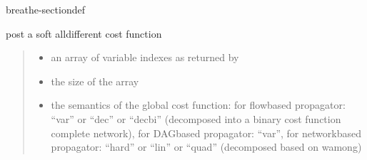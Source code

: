 \documentclass[letterpaper,10pt,openany,oneside,english]{sphinxmanual}
\begin{document}
\begin{fulllineitems}
\begin{sphinxuseclass}{breathe-sectiondef}
\begin{fulllineitems}
\label{\detokenize{ref/ref_cpp:_CPPv4N11WeightedCSP12postWAllDiffER6vectorIiERK6stringRK6string4Cost}}\label{\detokenize{ref/ref_cpp:_CPPv3N11WeightedCSP12postWAllDiffER6vectorIiERK6stringRK6string4Cost}}\label{\detokenize{ref/ref_cpp:_CPPv2N11WeightedCSP12postWAllDiffER6vectorIiERK6stringRK6string4Cost}}\label{\detokenize{ref/ref_cpp:WeightedCSP::postWAllDiff__vector:i:R.stringCR.stringCR.Cost}}
\pysigstartsignatures
\pysigstartmultiline
{}
\pysigstopmultiline
\pysigstopsignatures
\sphinxAtStartPar
post a soft alldifferent cost function 
\begin{quote}\begin{description}
\begin{itemize}
\item {} 
\sphinxAtStartPar
{} \textendash{} an array of variable indexes as returned by {\hyperref[\detokenize{ref/ref_cpp:classWeightedCSP_1a2329c94c60817153e45de627c79f8281}]{}} 

\item {} 
\sphinxAtStartPar
{} \textendash{} the size of the array 

\item {} 
\sphinxAtStartPar
{} \textendash{} the semantics of the global cost function: for flow\sphinxhyphen{}based propagator: “var” or “dec” or “decbi” (decomposed into a binary cost function complete network), for DAG\sphinxhyphen{}based propagator: “var”, for network\sphinxhyphen{}based propagator: “hard” or “lin” or “quad” (decomposed based on wamong) 


\end{itemize}
\end{description}
\end{quote}
\end{fulllineitems}
\end{sphinxuseclass}
\end{fulllineitems}
\end{document}

